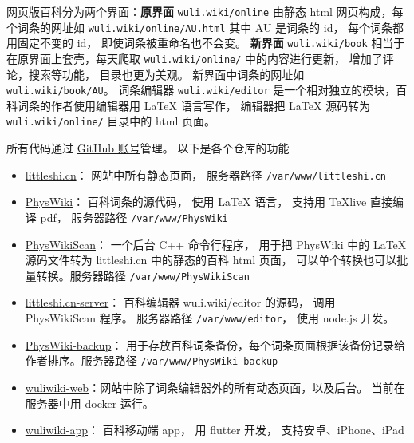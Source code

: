 
网页版百科分为两个界面：\textbf{原界面} \verb|wuli.wiki/online| 由静态 html 网页构成，每个词条的网址如 \verb|wuli.wiki/online/AU.html| 其中 AU 是词条的 id， 每个词条都用固定不变的 id， 即使词条被重命名也不会变。  \textbf{新界面} \verb|wuli.wiki/book| 相当于在原界面上套壳，每天爬取 \verb|wuli.wiki/online/| 中的内容进行更新， 增加了评论，搜索等功能， 目录也更为美观。 新界面中词条的网址如 \verb|wuli.wiki/book/AU|。
词条编辑器 \verb|wuli.wiki/editor| 是一个相对独立的模块，百科词条的作者使用编辑器用 LaTeX 语言写作， 编辑器把 LaTeX 源码转为 \verb|wuli.wiki/online/| 目录中的 html 页面。

所有代码通过 \href{https://github.com/wuliwiki}{GitHub 账号}管理。 以下是各个仓库的功能
\begin{itemize}
\item \href{https://github.com/MacroUniverse/littleshi.cn}{littleshi.cn}： 网站中所有静态页面， 服务器路径 \verb|/var/www/littleshi.cn|
\item \href{https://github.com/MacroUniverse/PhysWiki}{PhysWiki}： 百科词条的源代码， 使用 LaTeX 语言， 支持用 TeXlive 直接编译 pdf， 服务器路径 \verb|/var/www/PhysWiki|
\item \href{https://github.com/MacroUniverse/PhysWikiScan}{PhysWikiScan}： 一个后台 C++ 命令行程序， 用于把 PhysWiki 中的 LaTeX 源码文件转为 littleshi.cn 中的静态的百科 html 页面， 可以单个转换也可以批量转换。服务器路径 \verb|/var/www/PhysWikiScan|
\item \href{https://github.com/MacroUniverse/littleshi.cn-server}{littleshi.cn-server}： 百科编辑器 wuli.wiki/editor 的源码， 调用 PhysWikiScan 程序。 服务器路径 \verb|/var/www/editor|， 使用 node.js 开发。
\item \href{https://github.com/MacroUniverse/PhysWiki-backup}{PhysWiki-backup}： 用于存放百科词条备份，每个词条页面根据该备份记录给作者排序。服务器路径 \verb|/var/www/PhysWiki-backup|
\item \href{https://github.com/MacroUniverse/wuliwiki-web}{wuliwiki-web}：网站中除了词条编辑器外的所有动态页面，以及后台。 当前在服务器中用 docker 运行。
\item \href{https://github.com/MacroUniverse/wuliwiki-app}{wuliwiki-app}： 百科移动端 app， 用 flutter 开发， 支持安卓、iPhone、iPad
\end{itemize}
